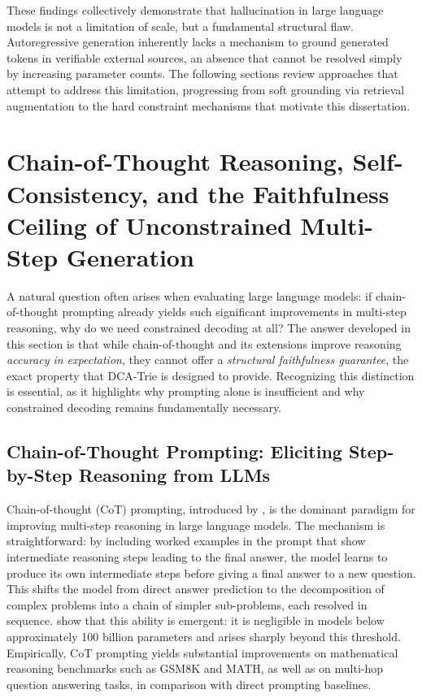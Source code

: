 These findings collectively demonstrate that hallucination in large language models is not a limitation of scale, but a fundamental structural flaw. Autoregressive generation inherently lacks a mechanism to ground generated tokens in verifiable external sources, an absence that cannot be resolved simply by increasing parameter counts. The following sections review approaches that attempt to address this limitation, progressing from soft grounding via retrieval augmentation to the hard constraint mechanisms that motivate this dissertation.

\section{Chain-of-Thought Reasoning, Self-Consistency, and the Faithfulness
  Ceiling of Unconstrained Multi-Step Generation}
\label{sec:cot}

A natural question often arises when evaluating large language models: if chain-of-thought prompting already yields such significant improvements in multi-step reasoning, why do we need constrained decoding at all? The answer developed in this section is that while chain-of-thought and its extensions improve reasoning \textit{accuracy in expectation}, they cannot offer a \textit{structural faithfulness guarantee}, the exact property that DCA-Trie is designed to provide. Recognizing this distinction is essential, as it highlights why prompting alone is insufficient and why constrained decoding remains fundamentally necessary.

\subsection{Chain-of-Thought Prompting: Eliciting Step-by-Step Reasoning from LLMs}

Chain-of-thought (CoT) prompting, introduced by \citet{wei2022cot}, is the dominant paradigm for improving multi-step reasoning in large language models. The mechanism is straightforward: by including worked examples in the prompt that show intermediate reasoning steps leading to the final answer, the model learns to produce its own intermediate steps before giving a final answer to a new
question. This shifts the model from direct answer prediction to the decomposition of complex problems into a chain of simpler sub-problems, each resolved in sequence. \citet{wei2022cot} show that this ability is emergent: it is negligible in models below approximately 100 billion parameters and arises
sharply beyond this threshold. Empirically, CoT prompting yields substantial improvements on mathematical reasoning benchmarks such as GSM8K and MATH, as well as on multi-hop question answering tasks, in comparison with direct prompting baselines.

